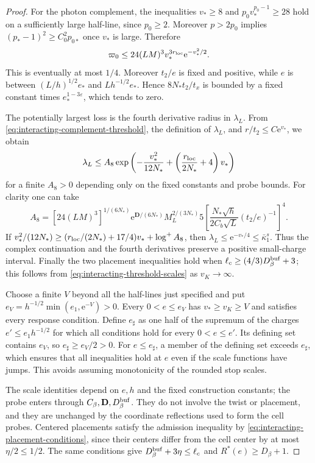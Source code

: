 \documentclass[11pt,letterpaper,reqno]{amsart}
\begin{document}
\begin{proof}
For the photon complement, the inequalities $v_*\ge8$ and
$p_0v_*^{p_0-1}\ge28$ hold on a sufficiently large half-line,
since $p_0\ge2$. Moreover $p>2p_0$ implies
$(p_*-1)^2\ge C_0^2p_{0*}$ once $v_*$
is large. Therefore
\begin{equation}\label{eq:interacting-complement-threshold}
 \varpi_0\le24(LM)^3v_*^{3r_{\rm loc}}\mathrm e^{-v_*^2/2}.
\end{equation}
This is eventually at most $1/4$.
Moreover $t_2/e$ is fixed and positive, while
$e$ is between $(L/h)^{1/2}e_*$
and $Lh^{-1/2}e_*$. Hence
$8N_*t_2/t_x$ is bounded by a fixed
constant times $e_*^{1-3\varepsilon}$,
which tends to zero.

The potentially largest loss is the fourth
derivative radius in $\lambda_L$.
From \eqref{eq:interacting-complement-threshold},
the definition of $\lambda_L$, and
$r/t_2\le C \mathrm e^{v_*}$, we obtain
\begin{equation}\label{eq:interacting-lambda-threshold}
 \lambda_L\le A_8
   \exp\left(-\frac{v_*^2}{12N_*}
                     +\left(\frac{r_{\rm loc}}{2N_*}+4\right)v_*\right)
\end{equation}
for a finite $A_8>0$ depending only on the
fixed constants and probe bounds.
For clarity one can take
\[
 A_8=[24(LM)^3]^{1/(6N_*)}
       \mathrm e^{\mathbf D/(6N_*)}M_L^{2/(3N_*)}
       5\left[
        \frac{N_*\sqrt h}{2C_b\sqrt L}(t_2/e)^{-1}\right]^4 .
\]
If
$v_*^2/(12N_*)\ge
(r_{\rm loc}/(2N_*)+17/4)v_*+\log^+A_8$,
then $\lambda_L\le \mathrm e^{-v_*/4}\le\bar\kappa_1^s$.
Thus the complex continuation and the
fourth derivatives preserve a positive
small-charge interval.
Finally the two placement inequalities
hold when
$\ell_c\ge(4/3)D_\beta^{\rm buf}+3$;
this follows from
\eqref{eq:interacting-threshold-scales} as $v_K\to\infty$.

Choose a finite $V$ beyond all the half-lines
just specified and put
$e_V=h^{-1/2}\min(e_1,\mathrm e^{-V})>0$.
Every $0<e\le e_V$ has $v_*\ge v_K\ge V$
and satisfies every response condition.
Define $e_\sharp$ as one half of the
supremum of the charges $e'\le e_1h^{-1/2}$
for which all conditions hold for every
$0<e\le e'$. Its defining set contains
$e_V$, so $e_\sharp\ge e_V/2>0$.
For $e\le e_\sharp$, a member of the
defining set exceeds $e_\sharp$, which
ensures that all inequalities hold at $e$
even if the scale functions have jumps.
This avoids assuming monotonicity of the
rounded stop scales.

The scale identities depend on $e,h$ and
the fixed construction constants; the probe
enters through
$C_\beta,\mathbf D,D_\beta^{\rm buf}$.
They do not involve the twist or placement,
and they are unchanged by the coordinate
reflections used to form the cell probes.
Centered placements satisfy the admission
inequality by
\eqref{eq:interacting-placement-conditions},
since their centers differ from the cell
center by at most $\eta/2\le1/2$.
The same conditions give
$D_\beta^{\rm buf}+3\eta\le\ell_c$ and
$R^*(e)\ge D_\beta+1$.
\end{proof}
\end{document}
